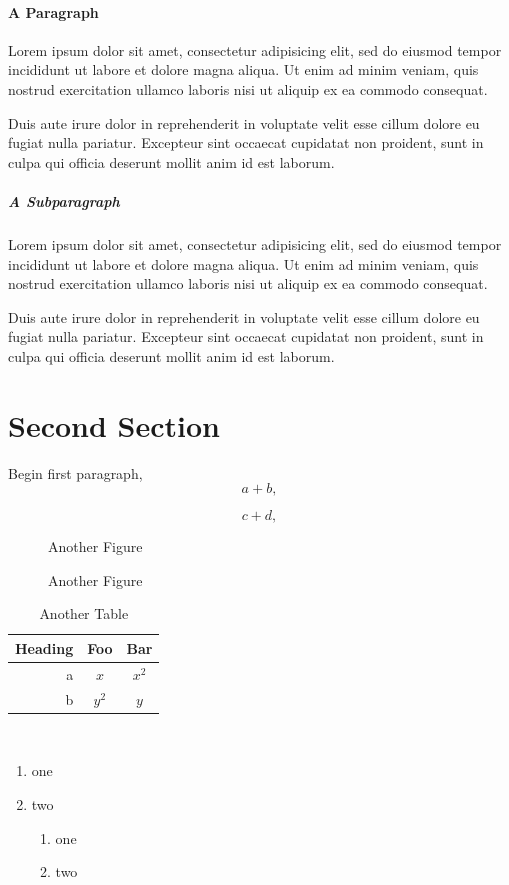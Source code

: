 \documentclass{article}
\begin{document}
\paragraph{A Paragraph}
Lorem ipsum dolor sit amet, consectetur adipisicing elit, sed do eiusmod tempor incididunt ut labore et dolore magna aliqua. Ut enim ad minim veniam, quis nostrud exercitation ullamco laboris nisi ut aliquip ex ea commodo consequat.

Duis aute irure dolor in reprehenderit in voluptate velit esse cillum dolore eu fugiat nulla pariatur. Excepteur sint occaecat cupidatat non proident, sunt in culpa qui officia deserunt mollit anim id est laborum.

\subparagraph{A Subparagraph}
Lorem ipsum dolor sit amet, consectetur adipisicing elit, sed do eiusmod tempor incididunt ut labore et dolore magna aliqua. Ut enim ad minim veniam, quis nostrud exercitation ullamco laboris nisi ut aliquip ex ea commodo consequat.

Duis aute irure dolor in reprehenderit in voluptate velit esse cillum dolore eu fugiat nulla pariatur. Excepteur sint occaecat cupidatat non proident, sunt in culpa qui officia deserunt mollit anim id est laborum.


\section{Second Section}
Begin first paragraph,
\begin{equation}
 a + b,
\end{equation}

\begin{equation}
 c + d,
\end{equation}

\begin{figure}
\begin{centering}
Another Figure\\
\end{centering}
\caption{Another Figure}
\end{figure}

\begin{table}
\begin{centering}
\caption{Another Table}
\begin{tabular}{r|cc}
Heading & Foo & Bar\\\hline
a & $x$ & $x^2$\\
b & $y^2$ & $y$\\
\end{tabular}\\
\end{centering}
\end{table}

\begin{enumerate}
 \item one
 \item two
   \begin{enumerate}
    \item one
    \item two
   \end{enumerate}
\end{enumerate}
\end{document}
